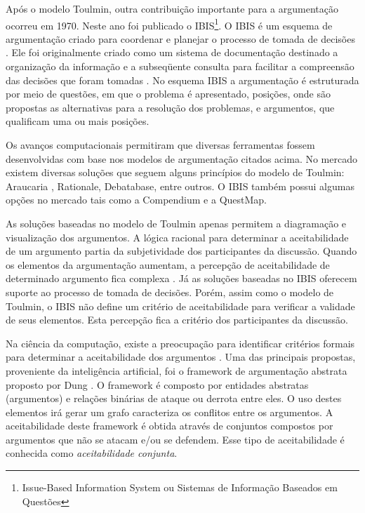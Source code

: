 Após o modelo Toulmin, outra contribuição importante para a argumentação ocorreu em 1970. Neste ano foi publicado o IBIS\footnote{Issue-Based Information System ou Sistemas de Informação Baseados em Questões}. O IBIS é um esquema de argumentação criado para coordenar e planejar o processo de tomada de decisões \cite{Kunz1970issuesas}. Ele foi originalmente criado como um sistema de documentação destinado a organização da informação e a subseqüente consulta para facilitar a compreensão das decisões que foram tomadas \cite{schneider2013Argumentation}. No esquema IBIS a argumentação é estruturada por meio de questões, em que o problema é apresentado, posições, onde são propostas as alternativas para a resolução dos problemas, e argumentos, que qualificam uma ou mais posições. 
%

Os avanços computacionais permitiram que diversas ferramentas fossem desenvolvidas com base nos modelos de argumentação citados acima. No mercado existem diversas soluções que seguem alguns princípios do modelo de Toulmin: Araucaria \cite{reed2004araucaria}, Rationale, Debatabase, entre outros. O IBIS também possui algumas opções no mercado tais como a Compendium e a QuestMap.
%

As soluções baseadas no modelo de Toulmin apenas permitem a diagramação e visualização dos argumentos. A lógica racional para determinar a aceitabilidade de um argumento partia da subjetividade dos participantes da discussão. Quando os elementos da argumentação aumentam, a percepção de aceitabilidade de determinado argumento fica complexa \cite{toulmin1958uses}. Já as soluções baseadas no IBIS oferecem suporte ao processo de tomada de decisões. Porém, assim como o modelo de Toulmin, o IBIS não define um critério de aceitabilidade para verificar a validade de seus elementos. Esta percepção fica a critério dos participantes da discussão.
%

Na ciência da computação, existe a preocupação para identificar critérios formais para determinar a aceitabilidade dos argumentos \cite{rahwan2008MAS}. Uma das principais propostas, proveniente da inteligência artificial, foi o framework de argumentação abstrata proposto por Dung \cite{dung1995321}. O framework é composto por entidades abstratas (argumentos) e relações binárias de ataque ou derrota entre eles. O uso destes elementos irá gerar um grafo caracteriza os conflitos entre os argumentos. A aceitabilidade deste framework é obtida através de conjuntos compostos por argumentos que não se atacam e/ou se defendem. Esse tipo de aceitabilidade é conhecida como \textit{aceitabilidade conjunta}.
%

